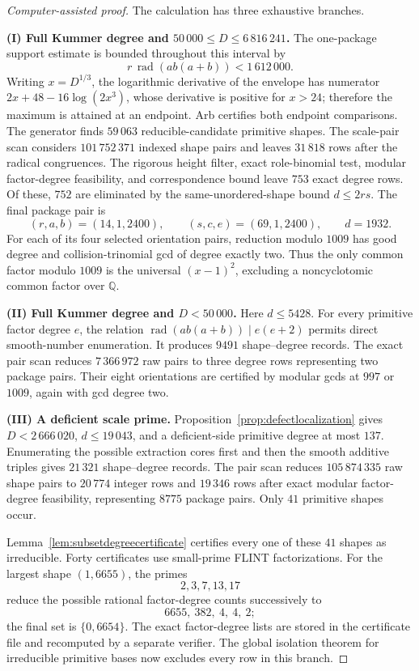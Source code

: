 \documentclass[11pt]{article}
\theoremstyle{definition}
\newcommand{\Q}{\mathbb Q}
\begin{document}
\begin{proof}[Computer-assisted proof]
The calculation has three exhaustive branches.

\smallskip
\noindent\textbf{(I) Full Kummer degree and \(50\,000\leq D\leq6\,816\,241\).}
The one-package support estimate is bounded throughout this interval by
\[
 r\,\operatorname{rad}(ab(a+b))<1\,612\,000.
\]
Writing \(x=D^{1/3}\), the logarithmic derivative of the envelope has
numerator
\(2x+48-16\log(2x^3)\), whose derivative is positive for \(x>24\);
therefore the maximum is attained at an endpoint.  Arb certifies both
endpoint comparisons.  The generator finds \(59\,063\) reducible-candidate
primitive shapes.  The scale-pair scan considers \(101\,752\,371\) indexed
shape pairs and leaves \(31\,818\) rows after the radical congruences.  The
rigorous height filter, exact role-binomial test, modular factor-degree
feasibility, and correspondence bound leave \(753\) exact degree rows.
Of these, \(752\) are eliminated by the same-unordered-shape bound
\(d\leq2rs\).  The final package pair is
\[
 (r,a,b)=(14,1,2400),\qquad(s,c,e)=(69,1,2400),
 \qquad d=1932.
\]
For each of its four selected orientation pairs, reduction modulo \(1009\)
has good degree and collision-trinomial gcd of degree exactly two.  Thus the
only common factor modulo \(1009\) is the universal \((x-1)^2\), excluding
a noncyclotomic common factor over \(\Q\).

\smallskip
\noindent\textbf{(II) Full Kummer degree and \(D<50\,000\).}
Here \(d\leq5428\).  For every primitive factor degree \(e\), the relation
\(\operatorname{rad}(ab(a+b))\mid e(e+2)\) permits direct smooth-number
enumeration.  It produces \(9491\) shape--degree records.  The exact pair
scan reduces \(7\,366\,972\) raw pairs to three degree rows representing two
package pairs.  Their eight orientations are certified by modular gcds at
\(997\) or \(1009\), again with gcd degree two.

\smallskip
\noindent\textbf{(III) A deficient scale prime.}
Proposition~\ref{prop:defectlocalization} gives
\(D<2\,666\,020\), \(d\leq19\,043\), and a deficient-side primitive degree
at most \(137\).  Enumerating the possible extraction cores first and then
the smooth additive triples gives \(21\,321\) shape--degree records.  The
pair scan reduces \(105\,874\,335\) raw shape pairs to \(20\,774\) integer
rows and \(19\,346\) rows after exact modular factor-degree feasibility,
representing \(8775\) package pairs.  Only \(41\) primitive shapes occur.

Lemma~\ref{lem:subsetdegreecertificate} certifies every one of these
\(41\) shapes as irreducible.  Forty certificates use small-prime FLINT
factorizations.  For the largest shape \((1,6655)\), the primes
\[
 2,3,7,13,17
\]
reduce the possible rational factor-degree counts successively to
\[
 6655,\ 382,\ 4,\ 4,\ 2;
\]
the final set is \(\{0,6654\}\).  The exact factor-degree lists are stored
in the certificate file and recomputed by a separate verifier.  The global
isolation theorem for irreducible primitive bases now excludes every row in
this branch.


\end{proof}
\end{document}
